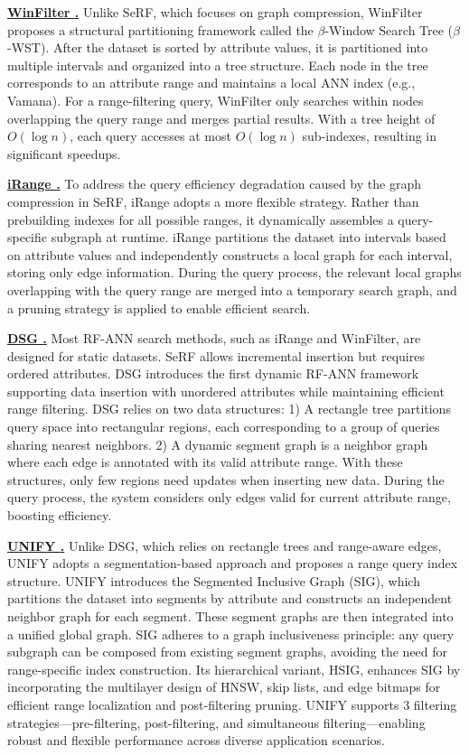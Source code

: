 \documentclass[sigconf, nonacm]{acmart}
\begin{document}
	
	\noindent\textbf{\underline{WinFilter \cite{winFilter}.}}  
	Unlike SeRF, which focuses on graph compression, WinFilter proposes a structural partitioning framework called the $\beta$-Window Search Tree ($\beta$-WST). After the dataset is sorted by attribute values, it is partitioned into multiple intervals and organized into a tree structure. Each node in the tree corresponds to an attribute range and maintains a local ANN index (e.g., Vamana). For a range-filtering query, WinFilter only searches within nodes overlapping the query range and merges partial results. With a tree height of $O(\log n)$, each query accesses at most $O(\log n)$ sub-indexes, resulting in significant speedups.
	
	\noindent\textbf{\underline{iRange \cite{iRangeGraph}.}}  
	To address the query efficiency degradation caused by the graph compression in SeRF, iRange adopts a more flexible strategy. Rather than prebuilding indexes for all possible ranges, it dynamically assembles a query-specific subgraph at runtime. iRange partitions the dataset into intervals based on attribute values and independently constructs a local graph for each interval, storing only edge information. During the query process, the relevant local graphs overlapping with the query range are merged into a temporary search graph, and a pruning strategy is applied to enable efficient search.
	
	\noindent\textbf{\underline{DSG \cite{DSG}.}}   
	Most RF-ANN search methods, such as iRange and WinFilter, are designed for static datasets. SeRF allows incremental insertion but requires ordered attributes. DSG introduces the first dynamic RF-ANN framework supporting data insertion with unordered attributes while maintaining efficient range filtering.
	DSG relies on two data structures: 1) A rectangle tree partitions query space into rectangular regions, each corresponding to a group of queries sharing nearest neighbors. 2) A dynamic segment graph is a neighbor graph where each edge is annotated with its valid attribute range.
	With these structures, only few regions need updates when inserting new data. During the query process, the system considers only edges valid for current attribute range, boosting efficiency.
	
	\noindent\textbf{\underline{UNIFY \cite{UNIFY}.}}  
	Unlike DSG, which relies on rectangle trees and range-aware edges, UNIFY adopts a segmentation-based approach and proposes a range query index structure. UNIFY introduces the Segmented Inclusive Graph (SIG), which partitions the dataset into segments by attribute and constructs an independent neighbor graph for each segment. These segment graphs are then integrated into a unified global graph. SIG adheres to a graph inclusiveness principle: any query subgraph can be composed from existing segment graphs, avoiding the need for range-specific index construction. Its hierarchical variant, HSIG, enhances SIG by incorporating the multilayer design of HNSW, skip lists, and edge bitmaps for efficient range localization and post-filtering pruning. UNIFY supports 3 filtering strategies—pre-filtering, post-filtering, and  simultaneous filtering—enabling robust and flexible performance across diverse application scenarios.
	
\end{document}
